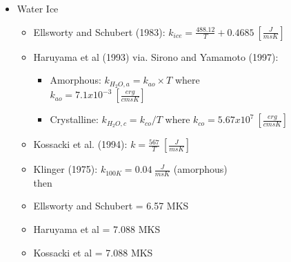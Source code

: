 \documentclass[11pt]{article} %
\begin{document}
\begin{figure}[ht]
\begin{Table}
\begin{Comment}
	\begin{itemize}
	\item Water Ice
		\begin{itemize}
		\item Ellsworty and Schubert (1983): $k_{ice} = \frac{488.12}{T} +0.4685 \: [\frac{J}{m s K}]$
		\item Haruyama et al (1993) via. Sirono and Yamamoto (1997):
			\begin{itemize}
			\item Amorphous: $k_{H_{2}O, a} = k_{ao} \times T$ where $k_{ao} = 7.1x10^{-3} \: [\frac{erg}{cm s K}]$
			\item Crystalline: $k_{H_{2}O, c} = k_{co}/T$ where $k_{co} = 5.67x10^{7} \: [\frac{erg}{cm s K}]$
			\end{itemize}
		\item Kossacki et al. (1994): $k = \frac{567}{T} \: [\frac{J}{m s K}]$
		\item Klinger (1975): $k_{100 K} = 0.04  \: \frac{J}{m s K}$ (amorphous)
		\\
		then
		\\
		\item Ellsworty and Schubert = 6.57 MKS
		\item Haruyama et al = 7.088 MKS
		\item Kossacki et al = 7.088 MKS
		\end{itemize}
		
	\end{itemize}


\end{Comment}
\end{Table}
\end{figure}
\end{document}
